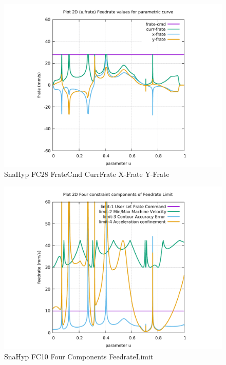 \begin{figure}
	\caption     {SnaHyp FC28 FrateCmd CurrFrate X-Frate Y-Frate}
	\label{30-img-SnaHyp-FC28-FrateCmd-CurrFrate-X-Frate-Y-Frate.pdf}
\includegraphics[width=1.00\textwidth]{Chap4/appendix/app-SnaHyp/plots/30-img-SnaHyp-FC40-FrateCmd-CurrFrate-X-Frate-Y-Frate.pdf}
\end{figure}


\clearpage
\pagebreak

\begin{figure}
	\caption     {SnaHyp FC10 Four Components FeedrateLimit}
	\label{31-img-SnaHyp-FC10-Four-Components-FeedrateLimit.pdf}
\includegraphics[width=1.00\textwidth]{Chap4/appendix/app-SnaHyp/plots/31-img-SnaHyp-FC10-Four-Components-FeedrateLimit.pdf}
\end{figure}



